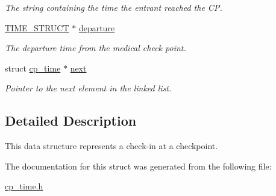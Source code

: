 \begin{DoxyCompactItemize}
\begin{DoxyCompactList}\small\item\em The string containing the time the entrant reached the C\-P. \end{DoxyCompactList}\item 
\hypertarget{structcp__time_a18914fe8c151c0caff70ebbd9a400ce1}{\hyperlink{time__struct_8h_a3bbd7adf563300f0bd980d2ea319881d}{T\-I\-M\-E\-\_\-\-S\-T\-R\-U\-C\-T} $\ast$ \hyperlink{structcp__time_a18914fe8c151c0caff70ebbd9a400ce1}{departure}}\label{structcp__time_a18914fe8c151c0caff70ebbd9a400ce1}

\begin{DoxyCompactList}\small\item\em The departure time from the medical check point. \end{DoxyCompactList}\item 
\hypertarget{structcp__time_a0061fc8f98b87bf7d79fc39c1fd67764}{struct \hyperlink{structcp__time}{cp\-\_\-time} $\ast$ \hyperlink{structcp__time_a0061fc8f98b87bf7d79fc39c1fd67764}{next}}\label{structcp__time_a0061fc8f98b87bf7d79fc39c1fd67764}

\begin{DoxyCompactList}\small\item\em Pointer to the next element in the linked list. \end{DoxyCompactList}\end{DoxyCompactItemize}



\subsection{Detailed Description}
This data structure represents a check-\/in at a checkpoint. 

The documentation for this struct was generated from the following file\-:\begin{DoxyCompactItemize}
\item 
\hyperlink{cp__time_8h}{cp\-\_\-time.\-h}\end{DoxyCompactItemize}
